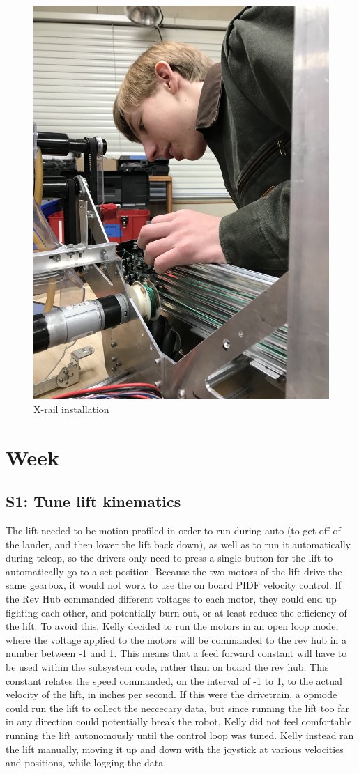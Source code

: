 \documentclass{article}
\begin{document}
\begin{figure}
    \centering
    \includegraphics[width=.6 \textwidth]{15_12-10/images/IMG_8107[1].jpg}
    \caption{X-rail installation}
    \label{fig:my_label}
\end{figure}

\clearpage \newpage \section{Week \thesection} 
\subsection{S1: Tune lift kinematics}

The lift needed to be motion profiled in order to run during auto (to get off of the lander, and then lower the lift back down), as well as to run it automatically during teleop, so the drivers only need to press a single button for the lift to automatically go to a set position. Because the two motors of the lift drive the same gearbox, it would not work to use the on board PIDF velocity control. If the Rev Hub commanded different voltages to each motor, they could end up fighting each other, and potentially burn out, or at least reduce the efficiency of the lift. To avoid this, Kelly decided to run the motors in an open loop mode, where the voltage applied to the motors will be commanded to the rev hub in a number between -1 and 1. This means that a feed forward constant will have to be used within the subsystem code, rather than on board the rev hub. This constant relates the speed commanded, on the interval of -1 to 1, to the actual velocity of the lift, in inches per second. If this were the drivetrain, a opmode could run the lift to collect the neccecary data, but since running the lift too far in any direction could potentially break the robot, Kelly did not feel comfortable running the lift autonomously until the control loop was tuned. Kelly instead ran the lift manually, moving it up and down with the joystick at various velocities and positions, while logging the data. 
\end{document}
